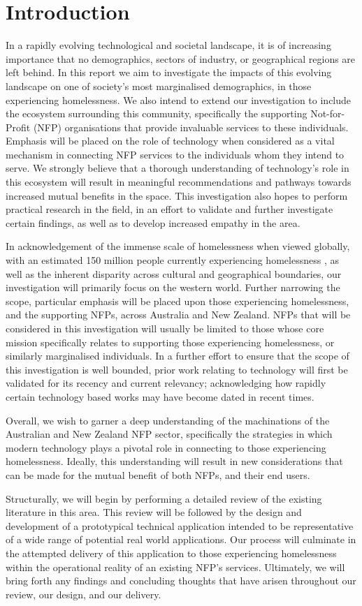\chapter{Introduction}

In a rapidly evolving technological and societal landscape, it is of increasing importance that no demographics, sectors of industry, or geographical regions are left behind. In this report we aim to investigate the impacts of this evolving landscape on one of society's most marginalised demographics, in those experiencing homelessness. We also intend to extend our investigation to include the ecosystem surrounding this community, specifically the supporting Not-for-Profit (NFP) organisations that provide invaluable services to these individuals. Emphasis will be placed on the role of technology when considered as a vital mechanism in connecting NFP services to the individuals whom they intend to serve. We strongly believe that a thorough understanding of technology's role in this ecosystem will result in meaningful recommendations and pathways towards increased mutual benefits in the space. This investigation also hopes to perform practical research in the field, in an effort to validate and further investigate certain findings, as well as to develop increased empathy in the area.

In acknowledgement of the immense scale of homelessness when viewed globally, with an estimated 150 million people currently experiencing homelessness \cite{chamie_2017}, as well as the inherent disparity across cultural and geographical boundaries, our investigation will primarily focus on the western world. Further narrowing the scope, particular emphasis will be placed upon those experiencing homelessness, and the supporting NFPs, across Australia and New Zealand. NFPs that will be considered in this investigation will usually be limited to those whose core mission specifically relates to supporting those experiencing homelessness, or similarly marginalised individuals. In a further effort to ensure that the scope of this investigation is well bounded, prior work relating to technology will first be validated for its recency and current relevancy; acknowledging how rapidly certain technology based works may have become dated in recent times.

Overall, we wish to garner a deep understanding of the machinations of the Australian and New Zealand NFP sector, specifically the strategies in which modern technology plays a pivotal role in connecting to those experiencing homelessness. Ideally, this understanding will result in new considerations that can be made for the mutual benefit of both NFPs, and their end users.

Structurally, we will begin by performing a detailed review of the existing literature in this area. This review will be followed by the design and development of a prototypical technical application intended to be representative of a wide range of potential real world applications. Our process will culminate in the attempted delivery of this application to those experiencing homelessness within the operational reality of an existing NFP's services. Ultimately, we will bring forth any findings and concluding thoughts that have arisen throughout our review, our design, and our delivery.